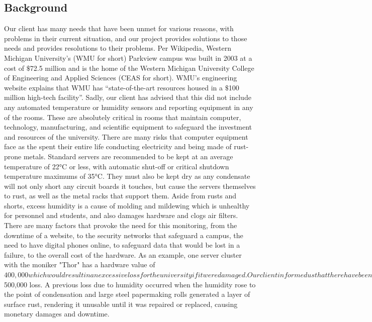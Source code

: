 \documentclass{report}
\begin{document}
\subsection*{Background}
Our client has many needs that have been unmet for various reasons, with problems in their current situation, and our project provides solutions to those needs and provides resolutions to their problems.
\newline
\indent
  Per Wikipedia, Western Michigan University's (WMU for short) Parkview campus was built in 2003 at a cost of $\$$72.5 million and is the home of the Western Michigan University College of Engineering and Applied Sciences (CEAS for short). 
 WMU’s engineering website explains that WMU has “state-of-the-art resources housed in a $\$$100 million high-tech facility”. 
Sadly, our client has advised that this did not include any automated temperature or humidity sensors and reporting equipment in any of the rooms. 
 These are absolutely critical in rooms that maintain computer, technology, manufacturing, and scientific equipment to safeguard the investment and resources of the university.  There are many risks that computer equipment face as the spent their entire life conducting electricity and being made of rust-prone metals. Standard servers are recommended to be kept at an average temperature of 22°C or less, with automatic shut-off or critical shutdown temperature maximums of 35°C. They must also be kept dry as any condensate will not only short any circuit boards it touches, but cause the servers themselves to rust, as well as the metal racks that support them. Aside from rusts and shorts, excess humidity is a cause of molding and mildewing which is unhealthy for personnel and students, and also damages hardware and clogs air filters. There are many factors that provoke the need for this monitoring, from the downtime of a website, to the security networks that safeguard a campus, the need to have digital phones online, to safeguard data that would be lost in a failure, to the overall cost of the hardware. As an example, one server cluster with the moniker "Thor" has a hardware value of $400,000 which would result in an excessive loss for the university if it were damaged. 
 Our client informed us that there have been several incidences where the temperature of servers increased unhindered to the point that equipment was destroyed due to this lack of automated environment reporting. One such incident where the temperature increased without staff knowing resulted in a ~$500,000 loss. A previous loss due to humidity occurred when the humidity rose to the point of condensation and large steel papermaking rolls generated a layer of surface rust, rendering it unusable until it was repaired or replaced, causing monetary damages and downtime. 
\end{document}
